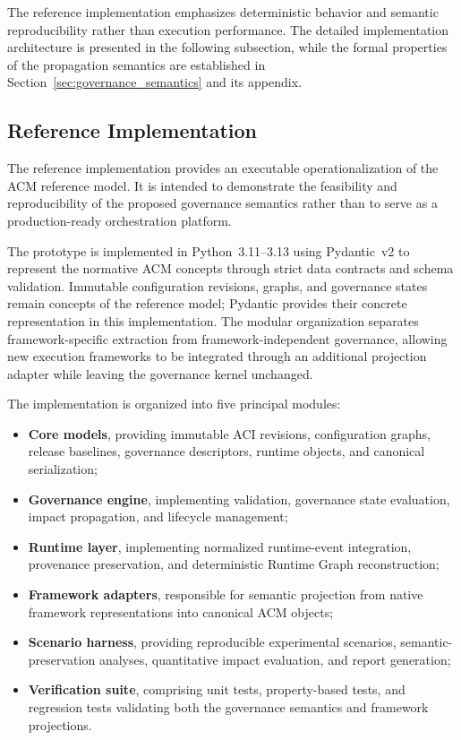 \documentclass[10pt]{article}
\begin{document}
The reference implementation emphasizes deterministic behavior and semantic
reproducibility rather than execution performance. The detailed implementation
architecture is presented in the following subsection, while the formal
properties of the propagation semantics are established in
Section~\ref{sec:governance_semantics} and its appendix.

\subsection{Reference Implementation}
\label{sec:reference_implementation}

The reference implementation provides an executable operationalization of the ACM reference model. It is intended to demonstrate the feasibility and reproducibility of the proposed governance semantics rather than to serve as a production-ready orchestration platform.

The prototype is implemented in Python~3.11--3.13 using Pydantic~v2 to represent
the normative ACM concepts through strict data contracts and schema validation.
Immutable configuration revisions, graphs, and governance states remain concepts
of the reference model; Pydantic provides their concrete representation in this
implementation. The modular organization separates framework-specific extraction
from framework-independent governance, allowing new execution frameworks to be
integrated through an additional projection adapter while leaving the governance
kernel unchanged.

The implementation is organized into five principal modules:

\begin{itemize}
	\item \textbf{Core models}, providing immutable ACI revisions, configuration graphs, release baselines, governance descriptors, runtime objects, and canonical serialization;
	\item \textbf{Governance engine}, implementing validation, governance state
	evaluation, impact propagation, and lifecycle management;
	\item \textbf{Runtime layer}, implementing normalized runtime-event integration,
	provenance preservation, and deterministic Runtime Graph reconstruction;
	\item \textbf{Framework adapters}, responsible for semantic projection from native framework representations into canonical ACM objects;
	\item \textbf{Scenario harness}, providing reproducible experimental scenarios, semantic-preservation analyses, quantitative impact evaluation, and report generation;
	\item \textbf{Verification suite}, comprising unit tests, property-based tests, and regression tests validating both the governance semantics and framework projections.
\end{itemize}
\end{document}
